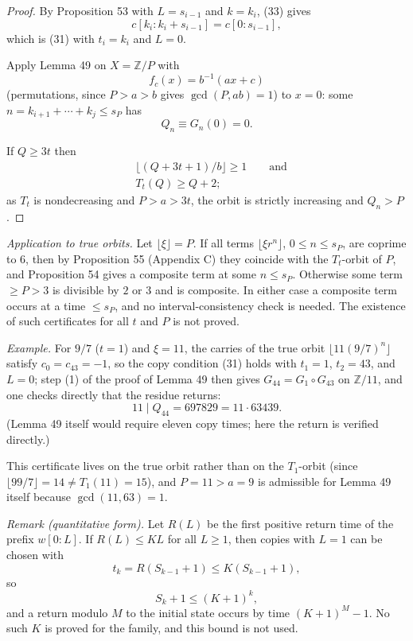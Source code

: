 \documentclass[11pt,reqno]{amsart}
\theoremstyle{definition}
\theoremstyle{remark}
\begin{document}
\begin{proof}\leavevmode\label{proof:54}
By Proposition 53 with \(L=s_{i-1}\) and \(k=k_i\), (33)
gives
\[
c[k_i:k_i+s_{i-1}]=c[0:s_{i-1}],
\]
which is (31) with
\(t_i=k_i\) and \(L=0\).

Apply Lemma 49 on \(X=\mathbb Z/P\) with
\[
f_c(x)=b^{-1}(ax+c)
\]
(permutations, since \(P>a>b\) gives
\(\gcd(P,ab)=1\)) to \(x=0\): some
\(n=k_{i+1}+\cdots+k_j\le s_P\)
has
\[
Q_n\equiv G_n(0)=0.
\]

If \(Q\ge3t\) then
\[
\begin{aligned}
&\lfloor(Q+3t+1)/b\rfloor\ge1\qquad\text{and}\\
&T_t(Q)\ge Q+2;
\end{aligned}
\]
as \(T_t\) is
nondecreasing and \(P>a>3t\), the orbit is strictly increasing and
\(Q_n>P\). \qedhere
\end{proof}

\emph{Application to true orbits.} Let \(\lfloor\xi\rfloor=P\). If all terms
\(\lfloor\xi r^n\rfloor\), \(0\le n\le s_P\), are coprime to \(6\), then
by Proposition 55 (Appendix C) they coincide with the \(T_t\)-orbit of
\(P\), and Proposition 54 gives a composite term at some
\(n\le s_P\). Otherwise some term \(\ge P>3\) is divisible by \(2\) or
\(3\) and is composite. In either case a composite term occurs at a time
\(\le s_P\), and no interval-consistency check is needed. The existence
of such certificates for all \(t\) and \(P\) is not proved.

\emph{Example.} For \(9/7\) (\(t=1\)) and \(\xi=11\), the carries of the true
orbit \(\lfloor11(9/7)^n\rfloor\) satisfy \(c_0=c_{43}=-1\), so the copy condition (31) holds with
\(t_1=1\), \(t_2=43\), and \(L=0\); step (1) of the proof of
Lemma 49 then gives \(G_{44}=G_1\circ G_{43}\) on
\(\mathbb Z/11\), and one checks directly that the residue returns:
\[
11\mid Q_{44}=697829=11\cdot63439.
\]
(Lemma 49 itself would require
eleven copy times; here the return is verified directly.)

This certificate lives on the true orbit
rather than on the \(T_1\)-orbit (since \(\lfloor99/7\rfloor=14\ne T_1(11)=15\)), and \(P=11>a=9\) is admissible for Lemma 49 itself because
\(\gcd(11,63)=1\).

\emph{Remark (quantitative form).} Let \(R(L)\) be the first positive return
time of the prefix \(w[0:L]\). If \(R(L)\le KL\) for all \(L\ge1\), then
copies with \(L=1\) can be chosen with
\[
t_k=R(S_{k-1}+1)\le
K(S_{k-1}+1),
\]
so
\[
S_k+1\le(K+1)^k,
\]
and a return modulo \(M\) to the
initial state occurs by time \((K+1)^M-1\). No such \(K\) is proved for
the family, and this bound is not used.
\end{document}
